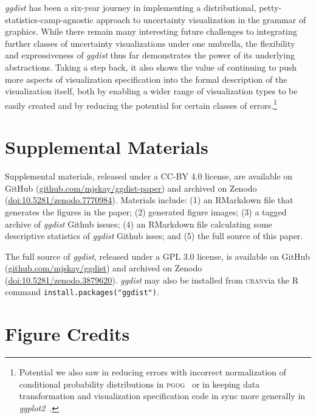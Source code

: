 \documentclass[journal]{vgtc}                     %
\providecommand{\DIFadd}[1]{{\protect\color{blue}\uwave{#1}}} %
\providecommand{\DIFaddbegin}{} %
\providecommand{\DIFaddend}{} %
\begin{document}
\textit{ggdist} has been a six-year journey in implementing a distributional, petty-statistics-camp-agnostic approach to uncertainty visualization in the grammar of graphics. While there remain many interesting future challenges to integrating further classes of uncertainty visualizations under one umbrella, the flexibility and expressiveness of \textit{ggdist} thus far demonstrates the power of its underlying abstractions. Taking a step back, it also shows the value of continuing to push more aspects of visualization specification into the formal description of the visualization itself, both by enabling a wider range of visualization types to be easily created and by reducing the potential for certain classes of errors.\footnote{Potential we also saw in reducing errors with incorrect normalization of conditional probability distributions in \textsc{pgog}~\cite{pu2020probabilistic} or in keeping data transformation and visualization specification code in sync more generally in \textit{ggplot2}~\cite{pu2023inpractice}.} 

\section*{Supplemental Materials}
\label{sec:supplemental_materials}

Supplemental materials, released under a CC-BY 4.0 license, are available on GitHub (\href{https://github.com/mjskay/ggdist-paper}{github.com/mjskay/ggdist-paper}) and archived on Zenodo (\href{https://doi.org/10.5281/zenodo.7770984}{doi:10.5281/zenodo.7770984}).
Materials include: (1) an RMarkdown file that generates the figures in the paper; (2) generated figure images; (3) a tagged archive of \textit{ggdist} Github issues; (4) an RMarkdown file calculating some descriptive statistics of \textit{ggdist} Github isses; and (5) the full source of this paper.

The full source of \textit{ggdist}, released under a GPL 3.0 license, is available on GitHub (\href{https://github.com/mjskay/ggdist}{github.com/mjskay/ggdist}) and archived on Zenodo (\href{https://doi.org/10.5281/zenodo.3879620}{doi:10.5281/zenodo.3879620}). \textit{ggdist} may also be installed from \textsc{cran}\DIFaddbegin \DIFadd{~\mbox{%
\cite{hornik2012cran} }\hskip0pt%
}\DIFaddend via the R command \texttt{install.packages("ggdist")}.

\section*{Figure Credits}
\label{sec:figure_credits}
\end{document}
